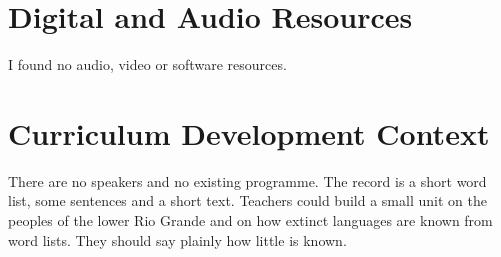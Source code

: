 \documentclass[12pt]{article}
\begin{document}
\section{Digital and Audio Resources}
I found no audio, video or software resources.

\section{Curriculum Development Context}
There are no speakers and no existing programme. The record is a short word list, some sentences and a short text. Teachers could build a small unit on the peoples of the lower Rio Grande and on how extinct languages are known from word lists. They should say plainly how little is known.
\end{document}

